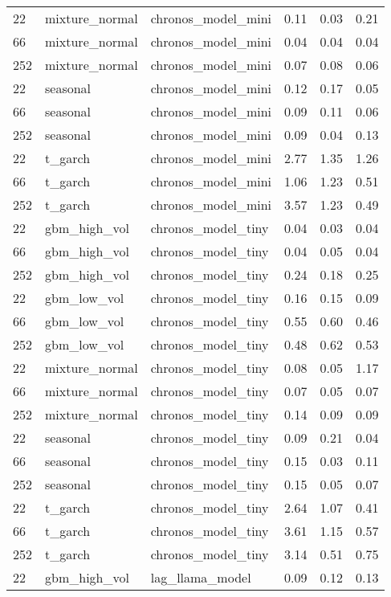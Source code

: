 {\begin{tabular}{lllrrr}
\midrule
22 & mixture\_normal & chronos\_model\_mini & 0.11 & 0.03 & 0.21 \\
66 & mixture\_normal & chronos\_model\_mini & 0.04 & 0.04 & 0.04 \\
252 & mixture\_normal & chronos\_model\_mini & 0.07 & 0.08 & 0.06 \\
\midrule
22 & seasonal & chronos\_model\_mini & 0.12 & 0.17 & 0.05 \\
66 & seasonal & chronos\_model\_mini & 0.09 & 0.11 & 0.06 \\
252 & seasonal & chronos\_model\_mini & 0.09 & 0.04 & 0.13 \\
\midrule
22 & t\_garch & chronos\_model\_mini & 2.77 & 1.35 & 1.26 \\
66 & t\_garch & chronos\_model\_mini & 1.06 & 1.23 & 0.51 \\
252 & t\_garch & chronos\_model\_mini & 3.57 & 1.23 & 0.49 \\
\midrule
22 & gbm\_high\_vol & chronos\_model\_tiny & 0.04 & 0.03 & 0.04 \\
66 & gbm\_high\_vol & chronos\_model\_tiny & 0.04 & 0.05 & 0.04 \\
252 & gbm\_high\_vol & chronos\_model\_tiny & 0.24 & 0.18 & 0.25 \\
\midrule
22 & gbm\_low\_vol & chronos\_model\_tiny & 0.16 & 0.15 & 0.09 \\
66 & gbm\_low\_vol & chronos\_model\_tiny & 0.55 & 0.60 & 0.46 \\
252 & gbm\_low\_vol & chronos\_model\_tiny & 0.48 & 0.62 & 0.53 \\
\midrule
22 & mixture\_normal & chronos\_model\_tiny & 0.08 & 0.05 & 1.17 \\
66 & mixture\_normal & chronos\_model\_tiny & 0.07 & 0.05 & 0.07 \\
252 & mixture\_normal & chronos\_model\_tiny & 0.14 & 0.09 & 0.09 \\
\midrule
22 & seasonal & chronos\_model\_tiny & 0.09 & 0.21 & 0.04 \\
66 & seasonal & chronos\_model\_tiny & 0.15 & 0.03 & 0.11 \\
252 & seasonal & chronos\_model\_tiny & 0.15 & 0.05 & 0.07 \\
\midrule
22 & t\_garch & chronos\_model\_tiny & 2.64 & 1.07 & 0.41 \\
66 & t\_garch & chronos\_model\_tiny & 3.61 & 1.15 & 0.57 \\
252 & t\_garch & chronos\_model\_tiny & 3.14 & 0.51 & 0.75 \\
\midrule
22 & gbm\_high\_vol & lag\_llama\_model & 0.09 & 0.12 & 0.13 \\

\end{tabular}}
